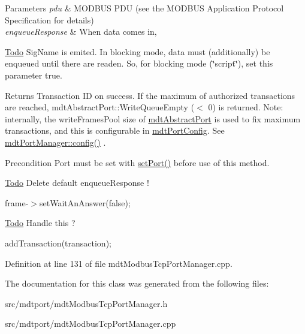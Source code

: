 \begin{DoxyParams}{Parameters}
{\em pdu} & MODBUS PDU (see the MODBUS Application Protocol Specification for details) \\
\hline
{\em enqueueResponse} & When data comes in,\\
\hline
\end{DoxyParams}
\begin{Desc}
\item[\hyperlink{todo__todo000023}{Todo}]SigName is emited. In blocking mode, data must (additionally) be enqueued until there are readen. So, for blocking mode (\char`\"{}script\char`\"{}), set this parameter true. \end{Desc}
\begin{DoxyReturn}{Returns}
Transaction ID on success. If the maximum of authorized transactions are reached, mdtAbstractPort::WriteQueueEmpty ($<$ 0) is returned. Note: internally, the writeFramesPool size of \hyperlink{classmdt_abstract_port}{mdtAbstractPort} is used to fix maximum transactions, and this is configurable in \hyperlink{classmdt_port_config}{mdtPortConfig}. See \hyperlink{classmdt_port_manager_a9cf3ea2da38f81682695b37448712ffd}{mdtPortManager::config()} . 
\end{DoxyReturn}
\begin{DoxyPrecond}{Precondition}
Port must be set with \hyperlink{classmdt_port_manager_afcd156b2d0c9d340999935efb6cd8cb6}{setPort()} before use of this method.
\end{DoxyPrecond}
\begin{Desc}
\item[\hyperlink{todo__todo000024}{Todo}]Delete default enqueueResponse ! \end{Desc}


frame-\/$>$setWaitAnAnswer(false);

\begin{Desc}
\item[\hyperlink{todo__todo000019}{Todo}]Handle this ? \end{Desc}


addTransaction(transaction); 



Definition at line 131 of file mdtModbusTcpPortManager.cpp.



The documentation for this class was generated from the following files:\begin{DoxyCompactItemize}
\item 
src/mdtport/mdtModbusTcpPortManager.h\item 
src/mdtport/mdtModbusTcpPortManager.cpp\end{DoxyCompactItemize}
